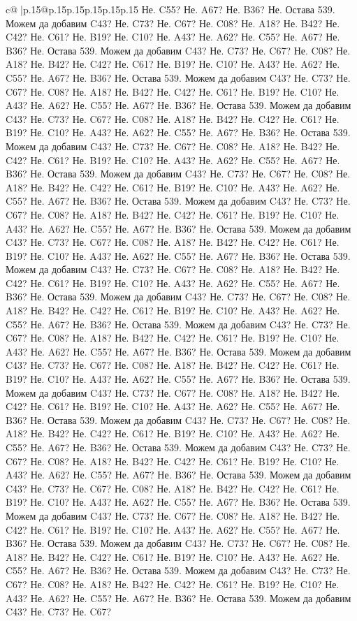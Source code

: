 \documentclass{article}
\begin{document}
{\begin{supertabular}{c@{$\;$}|p{.15\linewidth}@{}p{.15\linewidth}p{.15\linewidth}p{.15\linewidth}p{.15\linewidth}p{.15\linewidth}}
{{{Не. C55? Не. A67? Не. B36? Не. Остава 539. Можем да добавим C43? Не. C73? Не. C67? Не. C08? Не. A18? Не. B42? Не. C42? Не. C61? Не. B19? Не. C10? Не. A43? Не. A62? Не. C55? Не. A67? Не. B36? Не. Остава 539. Можем да добавим C43? Не. C73? Не. C67? Не. C08? Не. A18? Не. B42? Не. C42? Не. C61? Не. B19? Не. C10? Не. A43? Не. A62? Не. C55? Не. A67? Не. B36? Не. Остава 539. Можем да добавим C43? Не. C73? Не. C67? Не. C08? Не. A18? Не. B42? Не. C42? Не. C61? Не. B19? Не. C10? Не. A43? Не. A62? Не. C55? Не. A67? Не. B36? Не. Остава 539. Можем да добавим C43? Не. C73? Не. C67? Не. C08? Не. A18? Не. B42? Не. C42? Не. C61? Не. B19? Не. C10? Не. A43? Не. A62? Не. C55? Не. A67? Не. B36? Не. Остава 539. Можем да добавим C43? Не. C73? Не. C67? Не. C08? Не. A18? Не. B42? Не. C42? Не. C61? Не. B19? Не. C10? Не. A43? Не. A62? Не. C55? Не. A67? Не. B36? Не. Остава 539. Можем да добавим C43? Не. C73? Не. C67? Не. C08? Не. A18? Не. B42? Не. C42? Не. C61? Не. B19? Не. C10? Не. A43? Не. A62? Не. C55? Не. A67? Не. B36? Не. Остава 539. Можем да добавим C43? Не. C73? Не. C67? Не. C08? Не. A18? Не. B42? Не. C42? Не. C61? Не. B19? Не. C10? Не. A43? Не. A62? Не. C55? Не. A67? Не. B36? Не. Остава 539. Можем да добавим C43? Не. C73? Не. C67? Не. C08? Не. A18? Не. B42? Не. C42? Не. C61? Не. B19? Не. C10? Не. A43? Не. A62? Не. C55? Не. A67? Не. B36? Не. Остава 539. Можем да добавим C43? Не. C73? Не. C67? Не. C08? Не. A18? Не. B42? Не. C42? Не. C61? Не. B19? Не. C10? Не. A43? Не. A62? Не. C55? Не. A67? Не. B36? Не. Остава 539. Можем да добавим C43? Не. C73? Не. C67? Не. C08? Не. A18? Не. B42? Не. C42? Не. C61? Не. B19? Не. C10? Не. A43? Не. A62? Не. C55? Не. A67? Не. B36? Не. Остава 539. Можем да добавим C43? Не. C73? Не. C67? Не. C08? Не. A18? Не. B42? Не. C42? Не. C61? Не. B19? Не. C10? Не. A43? Не. A62? Не. C55? Не. A67? Не. B36? Не. Остава 539. Можем да добавим C43? Не. C73? Не. C67? Не. C08? Не. A18? Не. B42? Не. C42? Не. C61? Не. B19? Не. C10? Не. A43? Не. A62? Не. C55? Не. A67? Не. B36? Не. Остава 539. Можем да добавим C43? Не. C73? Не. C67? Не. C08? Не. A18? Не. B42? Не. C42? Не. C61? Не. B19? Не. C10? Не. A43? Не. A62? Не. C55? Не. A67? Не. B36? Не. Остава 539. Можем да добавим C43? Не. C73? Не. C67? Не. C08? Не. A18? Не. B42? Не. C42? Не. C61? Не. B19? Не. C10? Не. A43? Не. A62? Не. C55? Не. A67? Не. B36? Не. Остава 539. Можем да добавим C43? Не. C73? Не. C67? Не. C08? Не. A18? Не. B42? Не. C42? Не. C61? Не. B19? Не. C10? Не. A43? Не. A62? Не. C55? Не. A67? Не. B36? Не. Остава 539. Можем да добавим C43? Не. C73? Не. C67? Не. C08? Не. A18? Не. B42? Не. C42? Не. C61? Не. B19? Не. C10? Не. A43? Не. A62? Не. C55? Не. A67? Не. B36? Не. Остава 539. Можем да добавим C43? Не. C73? Не. C67? Не. C08? Не. A18? Не. B42? Не. C42? Не. C61? Не. B19? Не. C10? Не. A43? Не. A62? Не. C55? Не. A67? Не. B36? Не. Остава 539. Можем да добавим C43? Не. C73? Не. C67? Не. C08? Не. A18? Не. B42? Не. C42? Не. C61? Не. B19? Не. C10? Не. A43? Не. A62? Не. C55? Не. A67? Не. B36? Не. Остава 539. Можем да добавим C43? Не. C73? Не. C67? Не. C08? Не. A18? Не. B42? Не. C42? Не. C61? Не. B19? Не. C10? Не. A43? Не. A62? Не. C55? Не. A67? Не. B36? Не. Остава 539. Можем да добавим C43? Не. C73? Не. C67? }}}
\end{supertabular}}
\end{document}
